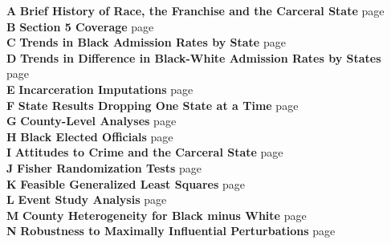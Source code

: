 \documentclass[12pt]{article}
\begin{document}
\noindent \textbf{A} \hspace*{.186in} \textbf{Brief History of Race, the Franchise and the Carceral State} \dotfill page~\pageref{appendix_history}\\
\noindent \textbf{B} \hspace*{.2in} \textbf{Section 5 Coverage} \dotfill page~\pageref{appendix_coverage}\\
\noindent \textbf{C} \hspace*{.2in} \textbf{Trends in Black Admission Rates by State} \dotfill page~\pageref{appendix_Black_rates_states}\\
\noindent \textbf{D} \hspace*{.197in} \textbf{Trends in Difference in Black-White Admission Rates by States}  \dotfill page~\pageref{appendix_diff_rates_states}\\
\noindent \textbf{E} \hspace*{.22in} \textbf{Incarceration Imputations}  \dotfill page~\pageref{appendix_imputations}\\
\noindent \textbf{F} \hspace*{.24in} \textbf{State Results Dropping One State at a Time}  \dotfill page~\pageref{appendix_jackknife}\\
\noindent \textbf{G} \hspace*{.2in} \textbf{County-Level Analyses}  \dotfill page~\pageref{appendix_county}\\
\noindent \textbf{H} \hspace*{.2in} \textbf{Black Elected Officials}  \dotfill page~\pageref{appendix_beo}\\
\noindent \textbf{I} \hspace*{.26in} \textbf{Attitudes to Crime and the Carceral State}  \dotfill page~\pageref{appendix_attitudes}\\
\noindent \textbf{J} \hspace*{.25in} \textbf{Fisher Randomization Tests}  \dotfill page~\pageref{appendix_fisher}\\
\noindent \textbf{K} \hspace*{.2in} \textbf{Feasible Generalized Least Squares}  \dotfill page~\pageref{appendix_fgls}\\
\noindent \textbf{L} \hspace*{.24in} \textbf{Event Study Analysis}  \dotfill page~\pageref{appendix_eventstudy}\\
\noindent \textbf{M} \hspace*{.188in} \textbf{County Heterogeneity for Black minus White}  \dotfill page~\pageref{appendix_countyheterogeneity_blackminuswhite}\\
\noindent \textbf{N} \hspace*{.215in} \textbf{Robustness to Maximally Influential Perturbations}  \dotfill page~\pageref{appendix_broderick}\\
\end{document}

